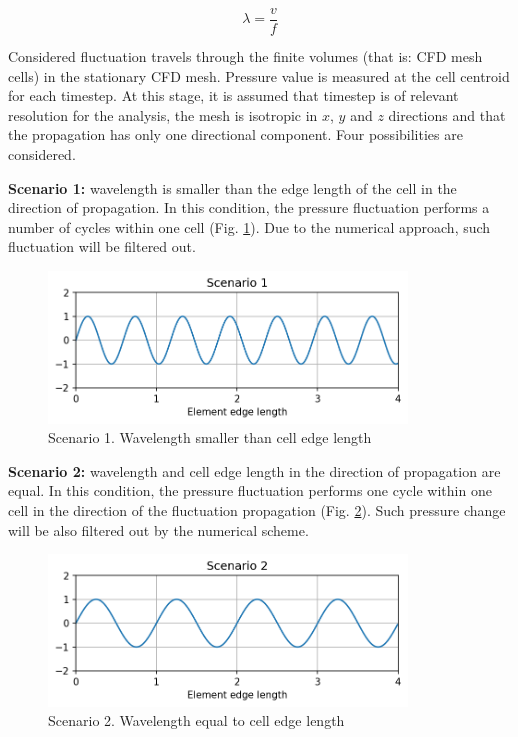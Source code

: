 \begin{equation} \label{eq:wl}
\lambda = \frac{v}{f}
\end{equation}

Considered fluctuation travels through the finite volumes (that is: CFD mesh cells) in the stationary CFD mesh. Pressure value is measured at the cell centroid for each timestep. At this stage, it is assumed that timestep is of relevant resolution for the analysis, the mesh is isotropic in $x$, $y$ and $z$ directions and that the propagation has only one directional component. Four possibilities are considered.

\textbf{Scenario 1:} wavelength is smaller than the edge length of the cell in the direction of propagation. In this condition, the pressure fluctuation performs a number of cycles within one cell (Fig. \ref{scen1}). Due to the numerical approach, such fluctuation will be filtered out.

\begin{figure}[h!]
\centering %
\includegraphics[width=0.85\textwidth]{Pictures/case1.png}
\caption{Scenario 1. Wavelength smaller than cell edge length}
\label{scen1}
\end{figure}

\textbf{Scenario 2:} wavelength and cell edge length in the direction of propagation are equal. In this condition, the pressure fluctuation performs one cycle within one cell in the direction of the fluctuation propagation (Fig. \ref{scen2}). Such pressure change will be also filtered out by the numerical scheme.

\begin{figure}[h!]
\centering %
\includegraphics[width=0.85\textwidth]{Pictures/case2.png}
\caption{Scenario 2. Wavelength equal to cell edge length}
\label{scen2}
\end{figure}

